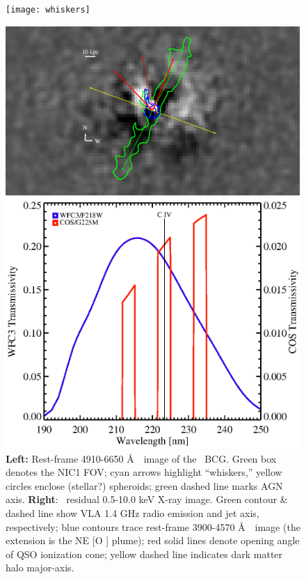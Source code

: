 \documentclass[12pt]{article}
\begin{document}
\begin{figure}[htp]
  \begin{center}
    \begin{minipage}{0.48\linewidth}	
      \texttt{[image: whiskers]}
    \end{minipage}
    \begin{minipage}{0.47\linewidth}
      \includegraphics*[width=\textwidth, trim=47mm 7mm 49mm 5mm, clip]{xray_sub_cones}
    \end{minipage}
    \caption{{\bf{Left:}} Rest-frame 4910-6650 \AA\ \hst\ image of the
      \irs\ BCG. Green box denotes the NIC1 FOV; cyan arrows highlight
      ``whiskers,'' yellow circles enclose (stellar?) spheroids; green
      dashed line marks AGN axis. {\bf{Right}}: \chandra\ residual
      0.5-10.0 keV X-ray image. Green contour \& dashed line show VLA
      1.4 GHz radio emission and jet axis, respectively; blue contours
      trace rest-frame 3900-4570 \AA\ \hst\ image (the extension is
      the NE [O ] plume); red solid lines denote opening
      angle of QSO ionization cone; yellow dashed line indicates dark
      matter halo major-axis.}
    \label{fig:i09}
    \begin{minipage}{0.53\linewidth}
      \includegraphics*[width=\textwidth, trim=29mm 5mm 28mm 5mm, clip]{uvis}

\end{minipage}
\end{center}
\end{figure}
\end{document}
